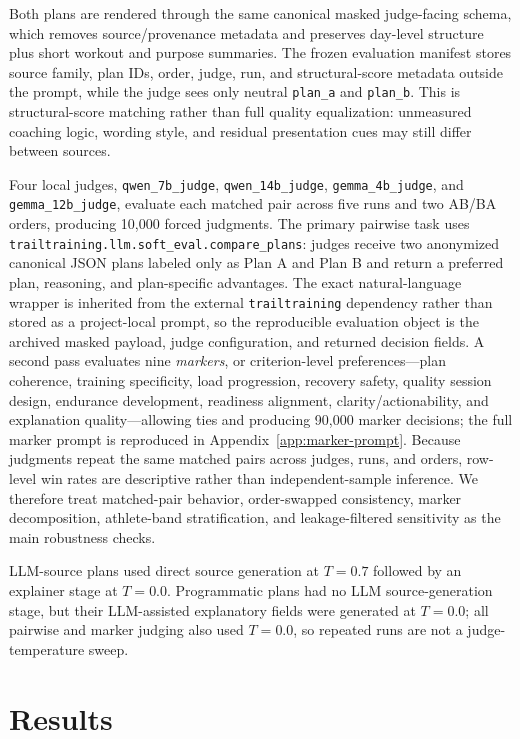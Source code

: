 \documentclass[11pt]{article}
\begin{document}
Both plans are rendered through the same canonical masked judge-facing schema, which removes source/provenance metadata and preserves day-level structure plus short workout and purpose summaries. The frozen evaluation manifest stores source family, plan IDs, order, judge, run, and structural-score metadata outside the prompt, while the judge sees only neutral \texttt{plan\_a} and \texttt{plan\_b}. This is structural-score matching rather than full quality equalization: unmeasured coaching logic, wording style, and residual presentation cues may still differ between sources.

Four local judges, \texttt{qwen\_7b\_judge}, \texttt{qwen\_14b\_judge}, \texttt{gemma\_4b\_judge}, and \texttt{gemma\_12b\_judge}, evaluate each matched pair across five runs and two AB/BA orders, producing 10,000 forced judgments. The primary pairwise task uses \texttt{trailtraining.llm.soft\_eval.compare\_plans}: judges receive two anonymized canonical JSON plans labeled only as Plan A and Plan B and return a preferred plan, reasoning, and plan-specific advantages. The exact natural-language wrapper is inherited from the external \texttt{trailtraining} dependency rather than stored as a project-local prompt, so the reproducible evaluation object is the archived masked payload, judge configuration, and returned decision fields. A second pass evaluates nine \emph{markers}, or criterion-level preferences---plan coherence, training specificity, load progression, recovery safety, quality session design, endurance development, readiness alignment, clarity/actionability, and explanation quality---allowing ties and producing 90,000 marker decisions; the full marker prompt is reproduced in Appendix~\ref{app:marker-prompt}. Because judgments repeat the same matched pairs across judges, runs, and orders, row-level win rates are descriptive rather than independent-sample inference. We therefore treat matched-pair behavior, order-swapped consistency, marker decomposition, athlete-band stratification, and leakage-filtered sensitivity as the main robustness checks.

LLM-source plans used direct source generation at \(T=0.7\) followed by an explainer stage at \(T=0.0\). Programmatic plans had no LLM source-generation stage, but their LLM-assisted explanatory fields were generated at \(T=0.0\); all pairwise and marker judging also used \(T=0.0\), so repeated runs are not a judge-temperature sweep.

\section{Results}
\end{document}
